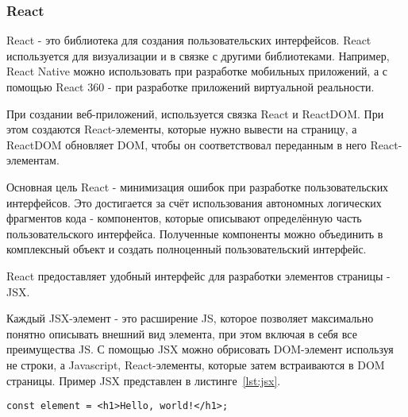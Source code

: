 \subsubsection{React}

React - это библиотека для создания пользовательских интерфейсов. React используется для визуализации и в связке с другими библиотеками. Например, React Native можно использовать при разработке мобильных приложений, а с помощью React 360 - при разработке приложений виртуальной реальности.

При создании веб-приложений, используется связка React и ReactDOM. При этом создаются React-элементы, которые нужно вывести на страницу, а ReactDOM обновляет DOM, чтобы он соответствовал переданным в него React-элементам.

Основная цель React - минимизация ошибок при разработке пользовательских интерфейсов. Это достигается за счёт использования автономных логических фрагментов кода - компонентов, которые описывают определённую часть пользовательского интерфейса. Полученные компоненты можно объединить в комплексный объект и создать полноценный пользовательский интерфейс.

React предоставляет удобный интерфейс для разработки элементов страницы - JSX.

Каждый JSX-элемент - это расширение JS, которое позволяет максимально понятно описывать внешний вид элемента, при этом включая в себя все преимущества JS. С помощью JSX можно обрисовать DOM-элемент используя не строки, а Javascript, React-элементы, которые затем встраиваются в DOM страницы. Пример JSX представлен в листинге~\ref{lst:jsx}.

\begin{lstlisting}[style=ES6, caption={Пример JSX-элемента}, label = {lst:jsx}]
const element = <h1>Hello, world!</h1>;
\end{lstlisting}